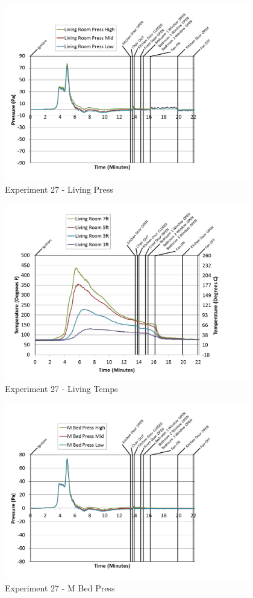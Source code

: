 \documentclass{article}
\begin{document}
\begin{appendices}
\clearpage

\begin{figure}[h!]
	\centering
	\includegraphics[height=3.05in]{0_Images/Results_Charts/Exp_27_Charts/LivingPress.png}
	\caption{Experiment 27 - Living Press}
\end{figure}


\begin{figure}[h!]
	\centering
	\includegraphics[height=3.05in]{0_Images/Results_Charts/Exp_27_Charts/LivingTemps.png}
	\caption{Experiment 27 - Living Temps}
\end{figure}

\clearpage

\begin{figure}[h!]
	\centering
	\includegraphics[height=3.05in]{0_Images/Results_Charts/Exp_27_Charts/MBedPress.png}
	\caption{Experiment 27 - M Bed Press}
\end{figure}



\end{appendices}
\end{document}
